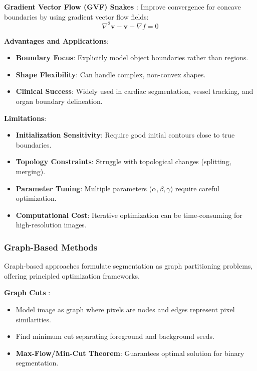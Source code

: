 \documentclass[12pt,a4paper]{article}
\begin{document}
\textbf{Gradient Vector Flow (GVF) Snakes} \cite{xu1998gradient}:
Improve convergence for concave boundaries by using gradient vector flow fields:
\begin{equation}
\nabla^2 \mathbf{v} - \mathbf{v} + \nabla f = 0
\end{equation}

\textbf{Advantages and Applications}:
\begin{itemize}
    \item \textbf{Boundary Focus}: Explicitly model object boundaries rather than regions.
    \item \textbf{Shape Flexibility}: Can handle complex, non-convex shapes.
    \item \textbf{Clinical Success}: Widely used in cardiac segmentation, vessel tracking, and organ boundary delineation.
\end{itemize}

\textbf{Limitations}:
\begin{itemize}
    \item \textbf{Initialization Sensitivity}: Require good initial contours close to true boundaries.
    \item \textbf{Topology Constraints}: Struggle with topological changes (splitting, merging).
    \item \textbf{Parameter Tuning}: Multiple parameters ($\alpha, \beta, \gamma$) require careful optimization.
    \item \textbf{Computational Cost}: Iterative optimization can be time-consuming for high-resolution images.
\end{itemize}

\subsubsection{Graph-Based Methods}

Graph-based approaches formulate segmentation as graph partitioning problems, offering principled optimization frameworks.

\textbf{Graph Cuts} \cite{boykov2001fast}:
\begin{itemize}
    \item Model image as graph where pixels are nodes and edges represent pixel similarities.
    \item Find minimum cut separating foreground and background seeds.
    \item \textbf{Max-Flow/Min-Cut Theorem}: Guarantees optimal solution for binary segmentation.
\end{itemize}
\end{document}

